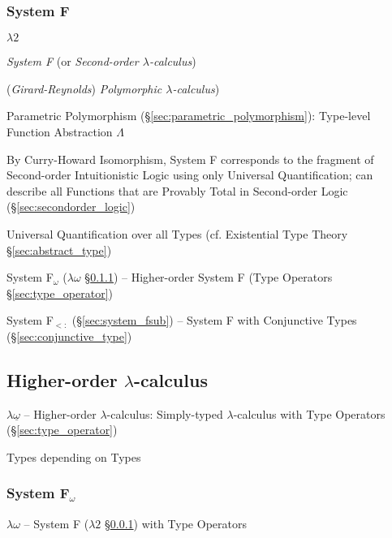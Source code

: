 \subsubsection{System F}\label{sec:system_f}

$\lambda2$

\emph{System F} (or \emph{Second-order $\lambda$-calculus})

(\emph{Girard-Reynolds}) \emph{Polymorphic $\lambda$-calculus})

Parametric Polymorphism (\S\ref{sec:parametric_polymorphism}):
Type-level Function Abstraction $\Lambda$

By Curry-Howard Isomorphism, System F corresponds to the fragment of
Second-order Intuitionistic Logic using only Universal Quantification;
can describe all Functions that are Provably Total in Second-order
Logic (\S\ref{sec:secondorder_logic})

Universal Quantification over all Types (cf. Existential Type Theory
\S\ref{sec:abstract_type}) %



System F$_\omega$ ($\lambda\omega$ \S\ref{sec:system_fomega}) --
  Higher-order System F (Type Operators \S\ref{sec:type_operator})

System F$_{<:}$ (\S\ref{sec:system_fsub}) -- System F with
  Conjunctive Types (\S\ref{sec:conjunctive_type})



\subsection{Higher-order $\lambda$-calculus}
\label{sec:higherorder_lambda}

$\lambda\underline{\omega}$ -- Higher-order $\lambda$-calculus:
Simply-typed $\lambda$-calculus with Type Operators
(\S\ref{sec:type_operator})

Types depending on Types



\subsubsection{System F$_\omega$}\label{sec:system_fomega}

$\lambda\omega$ -- System F ($\lambda2$ \S\ref{sec:system_f}) with
Type Operators



